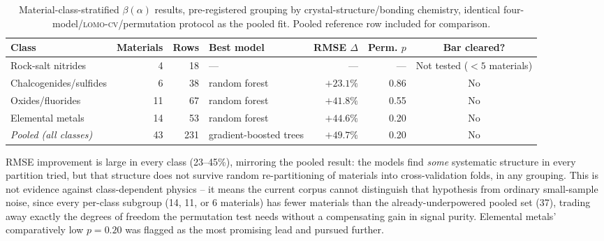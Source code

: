 \documentclass[aip,amsmath,amssymb,reprint]{revtex4-1}
\newcommand{\lomo}{\textsc{lomo-cv}}
\newcommand{\beto}{\ensuremath{\beta(\alpha)}}
\begin{document}
\begin{table}[htbp]
  \centering
  \caption{Material-class-stratified \beto{} results, pre-registered
    grouping by crystal-structure/bonding chemistry, identical
    four-model/\lomo{}/permutation protocol as the pooled fit.
    Pooled reference row included for comparison.}
  \label{tab:stratified}
  \begin{tabular}{lrrlrrc}
    \toprule
    Class & Materials & Rows & Best model & RMSE $\Delta$ & Perm. $p$ & Bar cleared? \\
    \midrule
    Rock-salt nitrides       & 4  & 18 & --- & --- & --- & Not tested ($<5$ materials) \\
    Chalcogenides/sulfides   & 6  & 38 & random forest          & $+23.1\%$ & 0.86 & No \\
    Oxides/fluorides         & 11 & 67 & random forest          & $+41.8\%$ & 0.55 & No \\
    Elemental metals         & 14 & 53 & random forest          & $+44.6\%$ & 0.20 & No \\
    \midrule
    \emph{Pooled (all classes)} & 43 & 231\footnotemark & gradient-boosted trees & $+49.7\%$ & 0.20 & No \\
    \bottomrule
  \end{tabular}
\end{table}

RMSE improvement is large in every class (23--45\%), mirroring the
pooled result: the models find \emph{some} systematic structure in
every partition tried, but that structure does not survive random
re-partitioning of materials into cross-validation folds, in any
grouping. This is not evidence against class-dependent physics -- it
means the current corpus cannot distinguish that hypothesis from
ordinary small-sample noise, since every per-class subgroup (14, 11,
or 6 materials) has fewer materials than the already-underpowered
pooled set (37), trading away exactly the degrees of freedom the
permutation test needs without a compensating gain in signal purity.
Elemental metals' comparatively low $p=0.20$ was flagged as the most
promising lead and pursued further.
\end{document}
